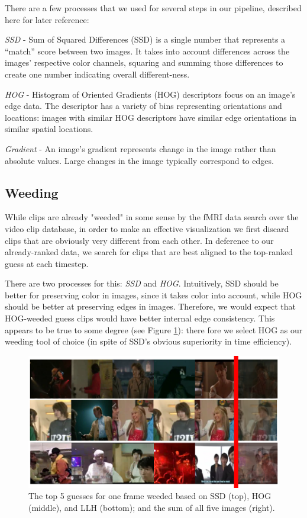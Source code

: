There are a few processes that we used for several steps in our pipeline, described here for later reference:

\emph{SSD} - Sum of Squared Differences (SSD) is a single number that represents a ``match'' score between two images.  It takes into account differences across the images' respective color channels, squaring and summing those differences to create one number indicating overall different-ness.

\emph{HOG} - Histogram of Oriented Gradients (HOG) descriptors focus on an image's edge data.  The descriptor has a variety of bins representing orientations and locations: images with similar HOG descriptors have similar edge orientations in similar spatial locations.

\emph{Gradient} - An image's gradient represents change in the image rather than absolute values.  Large changes in the image typically correspond to edges.

\subsection{Weeding}
While clips are already "weeded" in some sense by the fMRI data search over the video clip database, in order to make an effective visualization we first discard clips that are obviously very different from each other.  In deference to our already-ranked data, we search for clips that are best aligned to the top-ranked guess at each timestep.

There are two processes for this: \emph{SSD} and \emph{HOG}.  Intuitively, SSD should be better for preserving color in images, since it takes color into account, while HOG should be better at preserving edges in images.  Therefore, we would expect that HOG-weeded guess clips would have better internal edge consistency.  This appears to be true to some degree (see Figure \ref{fig:weeding}): there fore we select HOG as our weeding tool of choice (in spite of SSD's obvious superiority in time efficiency).

\begin{figure}
\centering
    \includegraphics[width=1.0\columnwidth]{figures/preproc.png}
\caption{The top 5 guesses for one frame weeded based on SSD (top), HOG (middle), and LLH (bottom); and the sum of all five images (right).}
\label{fig:weeding}
\end{figure}


